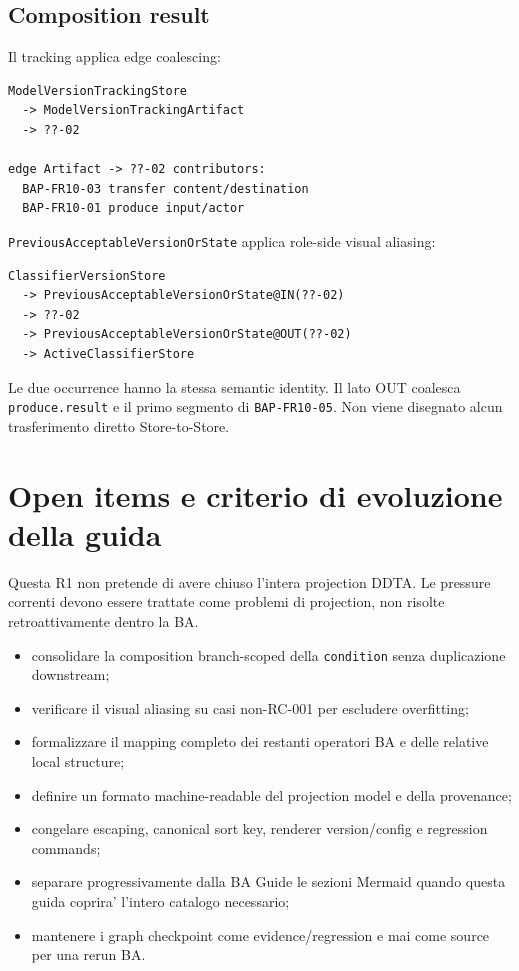 \documentclass[11pt,a4paper]{article}
\begin{document}
\subsection{Composition result}

Il tracking applica edge coalescing:

\begin{lstlisting}
ModelVersionTrackingStore
  -> ModelVersionTrackingArtifact
  -> ??-02

edge Artifact -> ??-02 contributors:
  BAP-FR10-03 transfer content/destination
  BAP-FR10-01 produce input/actor
\end{lstlisting}

\texttt{PreviousAcceptableVersionOrState} applica role-side visual aliasing:

\begin{lstlisting}
ClassifierVersionStore
  -> PreviousAcceptableVersionOrState@IN(??-02)
  -> ??-02
  -> PreviousAcceptableVersionOrState@OUT(??-02)
  -> ActiveClassifierStore
\end{lstlisting}

Le due occurrence hanno la stessa semantic identity. Il lato OUT coalesca \texttt{produce.result} e il primo segmento di \texttt{BAP-FR10-05}. Non viene disegnato alcun trasferimento diretto Store-to-Store.

\section{Open items e criterio di evoluzione della guida}

Questa R1 non pretende di avere chiuso l'intera projection DDTA. Le pressure correnti devono essere trattate come problemi di projection, non risolte retroattivamente dentro la BA.

\begin{itemize}
  \item consolidare la composition branch-scoped della \texttt{condition} senza duplicazione downstream;
  \item verificare il visual aliasing su casi non-RC-001 per escludere overfitting;
  \item formalizzare il mapping completo dei restanti operatori BA e delle relative local structure;
  \item definire un formato machine-readable del projection model e della provenance;
  \item congelare escaping, canonical sort key, renderer version/config e regression commands;
  \item separare progressivamente dalla BA Guide le sezioni Mermaid quando questa guida coprira' l'intero catalogo necessario;
  \item mantenere i graph checkpoint come evidence/regression e mai come source per una rerun BA.
\end{itemize}
\end{document}
